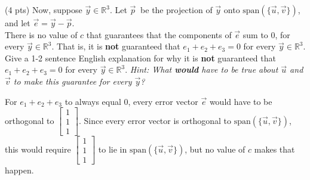 \documentclass[11pt]{article}
\begin{document}
\begin{prob}
\begin{subprob}(4 pts) Now, suppose $\vec y \in \mathbb{R}^3$. Let $\vec p \:$ be the projection of $\vec y$ onto $\text{span}(\{\vec u, \vec v\})$, and let $\vec e = \vec y - \vec p$. \\

There is no value of $c$ that guarantees that the components of $\vec e$ sum to 0, for every $\vec y \in \mathbb{R}^3$. That is, it is \textbf{not} guaranteed that $e_1 + e_2 + e_3 = 0$ for every $\vec y \in \mathbb{R}^3$. \\
    
Give a 1-2 sentence English explanation for why it is \textbf{not} guaranteed that $e_1 + e_2 + e_3 = 0$ for every $\vec y \in \mathbb{R}^3$. \textit{Hint: What \textbf{would} have to be true about $\vec u$ and $\vec v$ to make this guarantee for every $\vec y$?}

\emptybox{5cm}
\begin{solution}
For $e_1 + e_2 + e_3$ to always equal 0, every error vector $\vec e$ would have to be orthogonal to $\begin{bmatrix} 1 \\ 1 \\ 1 \end{bmatrix}$. Since every error vector is orthogonal to $\text{span}(\{\vec u, \vec v\})$, this would require $\begin{bmatrix} 1 \\ 1 \\ 1 \end{bmatrix}$ to lie in $\text{span}(\{\vec u, \vec v\})$, but no value of $c$ makes that happen.
\end{solution}
\end{subprob}



\end{prob}
\newpage
\end{document}
